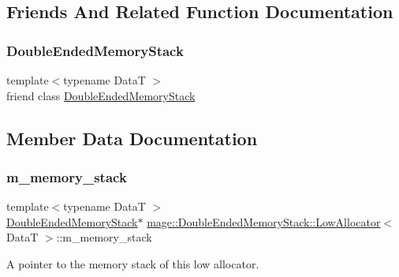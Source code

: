 \subsection{Friends And Related Function Documentation}
\hypertarget{classmage_1_1_double_ended_memory_stack_1_1_low_allocator_a10ae729d55b8c0017057250445835680}{}\label{classmage_1_1_double_ended_memory_stack_1_1_low_allocator_a10ae729d55b8c0017057250445835680} 
\subsubsection{\texorpdfstring{Double\+Ended\+Memory\+Stack}{DoubleEndedMemoryStack}}
{\footnotesize\ttfamily template$<$typename DataT $>$ \\
friend class \hyperlink{classmage_1_1_double_ended_memory_stack}{Double\+Ended\+Memory\+Stack}\hspace{0.3cm}{\ttfamily [friend]}}



\subsection{Member Data Documentation}
\hypertarget{classmage_1_1_double_ended_memory_stack_1_1_low_allocator_a662c9525b667d945f0f4685e773a8b61}{}\label{classmage_1_1_double_ended_memory_stack_1_1_low_allocator_a662c9525b667d945f0f4685e773a8b61} 
\subsubsection{\texorpdfstring{m\+\_\+memory\+\_\+stack}{m\_memory\_stack}}
{\footnotesize\ttfamily template$<$typename DataT $>$ \\
\hyperlink{classmage_1_1_double_ended_memory_stack}{Double\+Ended\+Memory\+Stack}$\ast$ \hyperlink{classmage_1_1_double_ended_memory_stack_1_1_low_allocator}{mage\+::\+Double\+Ended\+Memory\+Stack\+::\+Low\+Allocator}$<$ DataT $>$\+::m\+\_\+memory\+\_\+stack\hspace{0.3cm}{\ttfamily [private]}}

A pointer to the memory stack of this low allocator. 